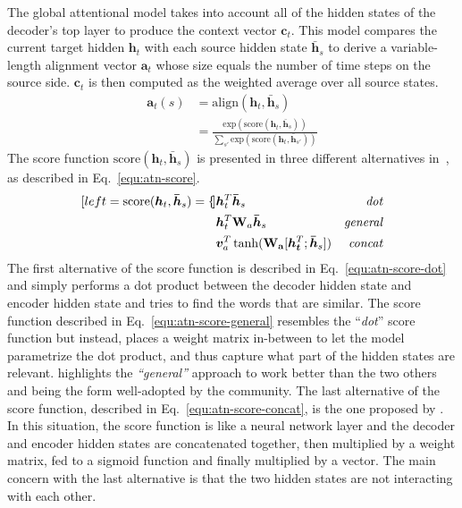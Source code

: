  The global attentional model takes into account all of the hidden states of the decoder's top layer to produce the context vector $\bm{c}_t$. This model compares the current target hidden $\bm{h}_t$ with each source hidden state $\bm{\bar{h}}_s$ to derive a variable-length alignment vector $\bm{a}_t$ whose size equals the number of time steps on the source side.
 $\bm{c}_t$ is then computed as the weighted average over all source states.
 \begin{align}
    \bm{a}_t(s) &= \mathrm{align}(\bm{h}_t, \bm{\bar{h}}_s)\\
    \label{equ:atn-a_t}
    &= \frac{\mathrm{exp}(\mathrm{score}(\bm{h}_t, \bm{\bar{h}}_s))}{\sum_{s'} \mathrm{exp}(\mathrm{score}(\bm{h}_t, \bm{\bar{h}}_{s'}))}
 \end{align}
The score function $\mathrm{score}(\bm{h}_t, \bm{\bar{h}}_s)$ is presented in three different alternatives in~\citet{1508.04025}, as described in Eq.~\ref{equ:atn-score}.
\begin{subequations}
    \label{equ:atn-score}
    \begin{align}[left ={\mathrm{score}(\bm{h}_t, \bm{\bar{h}}_s) = \empheqlbrace}]
        & \bm{h}_t^T \bm{\bar{h}}_s & \mathit{dot} \label{equ:atn-score-dot}\\
        & \bm{h}_t^T \mathbf{W}_a \bm{\bar{h}}_s & \mathit{general} \label{equ:atn-score-general}\\
        & \bm{v}_a^T \tanh ( \mathbf{W_a} [\bm{h_t}^T;\bm{\bar{h}}_s]) & \mathit{concat} \label{equ:atn-score-concat}
    \end{align}
\end{subequations}
The first alternative of the score function is described in Eq.~\ref{equ:atn-score-dot} and simply performs a dot product between the decoder hidden state and encoder hidden state and tries to find the words that are similar.
The score function described in Eq.~\ref{equ:atn-score-general} resembles the ``\textit{dot}'' score function but instead, places a weight matrix in-between to let the model parametrize the dot product, and thus capture what part of the hidden states are relevant. \citet{youtube-nmt-attention} highlights the \textit{``general''} approach to work better than the two others and being the form well-adopted by the community.
The last alternative of the score function, described in Eq.~\ref{equ:atn-score-concat}, is the one proposed by \citet{1409.0473}. In this situation, the score function is like a neural network layer and the decoder and encoder hidden states are concatenated together, then multiplied by a weight matrix, fed to a sigmoid function and finally multiplied by a vector. The main concern with the last alternative is that the two hidden states are not interacting with each other.

